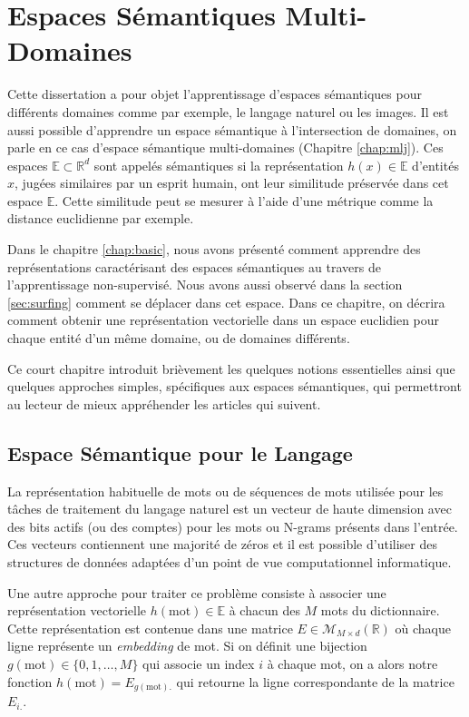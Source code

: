 \chapter{Espaces Sémantiques Multi-Domaines}

Cette dissertation a pour objet l'apprentissage d'espaces sémantiques pour
différents domaines comme par exemple, le langage naturel ou les images. Il est
aussi possible d'apprendre un espace sémantique à l'intersection de domaines,
on parle en ce cas d'espace sémantique multi-domaines (Chapitre
\ref{chap:mlj}). Ces espaces $\mathbb{E}\subset \mathbb{R}^{d}$ sont appelés
sémantiques si la représentation $h(x)\in \mathbb{E}$ d'entités $x$, jugées
similaires par un esprit humain, ont leur similitude préservée dans cet espace
$\mathbb{E}$. Cette similitude peut se mesurer à l'aide d'une métrique comme la
distance euclidienne par exemple.

Dans le chapitre \ref{chap:basic}, nous avons présenté comment apprendre des
représentations caractérisant des espaces sémantiques au travers de
l'apprentissage non-supervisé. Nous avons aussi observé dans la section
\ref{sec:surfing} comment se déplacer dans cet espace.  Dans ce chapitre, on
décrira comment obtenir une représentation vectorielle dans un espace euclidien
pour chaque entité d'un même domaine, ou de domaines différents.
 
Ce court chapitre introduit brièvement les quelques notions essentielles ainsi
que quelques approches simples, spécifiques aux espaces sémantiques, qui
permettront au lecteur de mieux appréhender les articles qui suivent.
  
\section{Espace Sémantique pour le Langage}

La représentation habituelle de mots ou de séquences de mots utilisée pour les
tâches de traitement du langage naturel est un vecteur de haute dimension avec
des bits actifs (ou des comptes) pour les mots ou N-grams présents dans
l'entrée. Ces vecteurs contiennent une majorité de zéros et il est possible
d'utiliser des structures de données adaptées d'un point de
vue computationnel informatique.

Une autre approche pour traiter ce problème consiste à associer une
représentation vectorielle $h(\textrm{mot})\in\mathbb{E}$ à chacun des $M$ mots
du dictionnaire. Cette représentation est contenue dans une matrice
$E\in\mathcal{M}_{M \times d}(\mathbb{R})$ où chaque ligne représente un {\it
embedding} de mot. Si on définit une bijection $g(\textrm{mot}) \in \lbrace
0,1,\dots, M \rbrace$ qui associe un index $i$ à chaque mot, on a alors notre
fonction $h(\textrm{mot})=E_{g(\textrm{mot}).}$ qui retourne la ligne
correspondante de la matrice $E_{i.}$.


